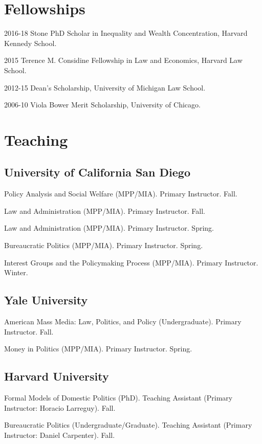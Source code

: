 \documentclass[12pt,letterpaper]{report}
\newcommand{\course}[5]{\item[#1] \tab{}#3 (#4). #5. #2.} %
\begin{document}
    
    \section*{Fellowships}
    
    \begin{tablist}
    \item[2016-18] \tab{}Stone PhD Scholar in Inequality and Wealth Concentration, Harvard Kennedy School.
    \item[2015] \tab{}Terence M. Considine Fellowship in Law and Economics, Harvard Law School.
    \item[2012-15] \tab{}Dean's Scholarship, University of Michigan Law School.
    \item[2006-10] \tab{}Viola Bower Merit Scholarship, University of Chicago.
    \end{tablist}

    \section*{Teaching}
    
    \subsection*{University of California San Diego}
    \begin{tablist}
    \course{2021}{Fall}{Policy Analysis and Social Welfare}{MPP/MIA}{Primary Instructor}
    \course{2021}{Fall}{Law and Administration}{MPP/MIA}{Primary Instructor}
    \course{2021}{Spring}{Law and Administration}{MPP/MIA}{Primary Instructor}
    \course{2021}{Spring}{Bureaucratic Politics}{MPP/MIA}{Primary Instructor}
    \course{2021}{Winter}{Interest Groups and the Policymaking Process}{MPP/MIA}{Primary Instructor}
    \end{tablist}
    
    \subsection*{Yale University}
    \begin{tablist}
    \course{2019}{Fall}{American Mass Media: Law, Politics, and Policy}{Undergraduate}{Primary Instructor}
    \course{2019}{Spring}{Money in Politics}{MPP/MIA}{Primary Instructor}
    \end{tablist}
    
    
    \subsection*{Harvard University}
    \begin{tablist}
    \course{2017}{Fall}{Formal Models of Domestic Politics}{PhD}{Teaching Assistant (Primary Instructor: Horacio Larreguy)}
    \course{2016}{Fall}{Bureaucratic Politics}{Undergraduate/Graduate}{Teaching Assistant (Primary Instructor: Daniel Carpenter)}
    \end{tablist}
\end{document}
